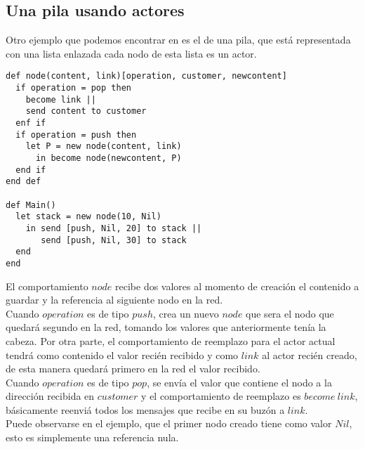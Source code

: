 \subsection{Una pila usando actores}

Otro ejemplo que podemos encontrar en \cite{Agha:1986:AMC:7929} es el de una pila,
que está representada con una lista enlazada cada nodo de esta lista es un actor. 

\begin{lstlisting}[language=sal, style=simple]
def node(content, link)[operation, customer, newcontent]
  if operation = pop then
    become link ||
    send content to customer
  enf if
  if operation = push then
    let P = new node(content, link)
      in become node(newcontent, P) 
  end if
end def

def Main() 
  let stack = new node(10, Nil)
    in send [push, Nil, 20] to stack ||
       send [push, Nil, 30] to stack
  end
end
\end{lstlisting}

El comportamiento $node$ recibe dos valores al momento de creación el contenido a guardar y la referencia al siguiente nodo en la red. \\
Cuando $operation$ es de tipo $push$, crea un nuevo $node$ que sera el nodo que quedará segundo en la red, 
tomando los valores que anteriormente tenía la cabeza. Por otra parte, el comportamiento de reemplazo para el actor actual tendrá 
como contenido el valor recién recibido y como $link$ al actor recién creado, de esta manera quedará primero en la red el valor recibido. \\
Cuando $operation$ es de tipo $pop$, se envía el valor que contiene el nodo a la dirección recibida en $customer$ y el comportamiento 
de reemplazo es $become\ link$, básicamente reenviá todos los mensajes que recibe en su buzón a $link$. \\
Puede observarse en el ejemplo, que el primer nodo creado tiene como valor $Nil$, esto es simplemente una referencia nula. 
